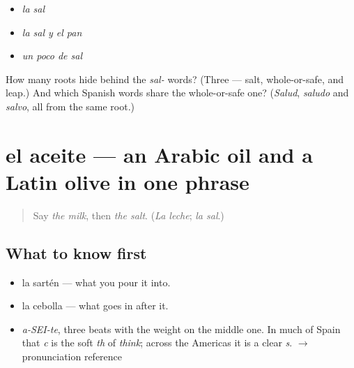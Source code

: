 \begin{itemize}
\raggedright
  \item \emph{la sal}
  \item \emph{la sal y el pan}
  \item \emph{un poco de sal}
\end{itemize}

\begin{tcolorbox}[breakable,colback=teal!4,colframe=teal!35!black,title={Before you move on}]
How many roots hide behind the \emph{sal-} words? (Three — salt, whole-or-safe, and leap.) And which Spanish words share the whole-or-safe one? (\emph{Salud}, \emph{saludo} and \emph{salvo}, all from the same root.)
\end{tcolorbox}
\section[el aceite]{el aceite — an Arabic oil and a Latin olive in one phrase}

\label{lesson:ES-C361-aceite}



\begin{quote}
Say \emph{the milk}, then \emph{the salt}. (\emph{La leche}; \emph{la sal}.)
\end{quote}

\subsection*{What to know first}
\begin{itemize}
\raggedright
  \item la sartén — what you pour it into.
  \item la cebolla — what goes in after it.
\end{itemize}

\begin{sounds}
\begin{itemize}
\raggedright
  \item \emph{a-SEI-te}, three beats with the weight on the middle one. In much of Spain that \emph{c} is the soft \emph{th} of \emph{think}; across the Americas it is a clear \emph{s}. $\to$ pronunciation reference
\end{itemize}
\end{sounds}

